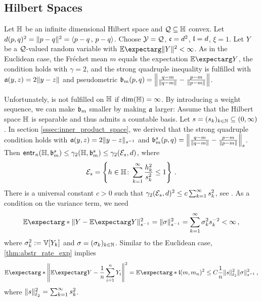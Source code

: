 \subsection{Hilbert Spaces}\label{ssec:app:hilbert}
%
	Let $\mathbb{H}$ be an infinite dimensional Hilbert space and $\mathcal{Q} \subseteq \mathbb{H}$ convex.
	Let $d(p,q)^2 = \Vert p-q \Vert^2 = \left\langle p-q\,,\, p-q\right\rangle$.
	Choose $\mathcal{Y} = \mathcal{Q}$, $\mathfrak{c} =  d^2$, $\mathfrak{l} = d$, $\xi=1$.
	Let $Y$ be a $\mathcal{Q}$-valued random variable with $\Ex{\normof{Y}^2}<\infty$.
	As in the Euclidean case, the Fréchet mean $m$ equals the expectation $\Ex{Y}$, the  condition holds with $\gamma=2$, and the strong quadruple inequality is fulfilled with $\mathfrak{a}(y,z) = 2 \Vert y-z \Vert$ and pseudometric $\mathfrak{b}_m(p,q) = \left\Vert \frac{q-m}{\Vert q-m \Vert}-\frac{p-m}{\Vert p-m \Vert} \right\Vert$.
	
	Unfortunately,  is not fulfilled on $\mathbb{H}$ if $\dim(\mathbb{H}) = \infty$. 
	By introducing a weight sequence, we can make $\mathfrak{b}_m$ smaller by making $\mathfrak{a}$ larger: 
	Assume that the Hilbert space $\mathbb{H}$ is separable and thus admits a countable basis. Let $s=(s_k)_{k\in\mathbb{N}} \subseteq(0,\infty)$.
	In section \ref{sssec:inner_product_space}, we derived that the strong quadruple condition holds with
	$\mathfrak{a}(y,z) = 2\Vert y-z \Vert_{s^{-1}}$ and $\mathfrak{b}_m^s (p,q)=  \left\Vert \frac{q-m}{\Vert q-m \Vert}-\frac{p-m}{\Vert p-m \Vert} \right\Vert_{s}$.
	Then $\operatorname{\mathsf{entr}_\mathit{n}}(\mathbb{H}, \mathfrak{b}_m^s) \leq \gamma_2(\mathbb{H}, \mathfrak{b}_m^s) \leq \gamma_2(\mathcal{E}_s, d)$, where 
	\begin{equation*}
		\mathcal{E}_s = \left\lbrace h\in\mathbb{H} \colon \sum_{k=1}^\infty \frac{h_k^2}{s_k^2}\leq 1 \right\rbrace
		\, .
	\end{equation*}
	There is a universal constant $c>0$ such that $\gamma_2(\mathcal{E}_s, d)^2 \leq c \sum_{k=1}^\infty s_k^2$, see \cite[Proposition 2.5.1]{talagrand14}.
	As a condition on the variance term, we need
	\begin{equation*}
		\Ex*{\normof{Y-\Ex{Y}}_{s^{-1}}^2} = \normof{\sigma}_{s^{-1}}^2 = \sum_{k=1}^\infty \sigma^2_k s_k^{-2}< \infty
		\eqcm
	\end{equation*}
	where $\sigma^2_k := \mathbb{V}\!\left[ Y_k \right]$ and $\sigma = (\sigma_k)_{k\in\mathbb{N}}$.
	Similar to the Euclidean case, \autoref{thm:abstr_rate_exp} implies
	\begin{equation*}
		\Ex*{\normOf{\Ex{Y}-\frac1n\sum_{i=1}^nY_i}^2} 
		=
		\Ex*{\mf l(m,m_n)^2} 
		\leq
		C \frac1n \normof{s}_{\ell_2}^2 \normof{\sigma}_{s^{-1}}^2
		\eqcm
	\end{equation*}
	where $\Vert s \Vert_{\ell_2}^2 = \sum_{k=1}^\infty s_k^2$.
	
